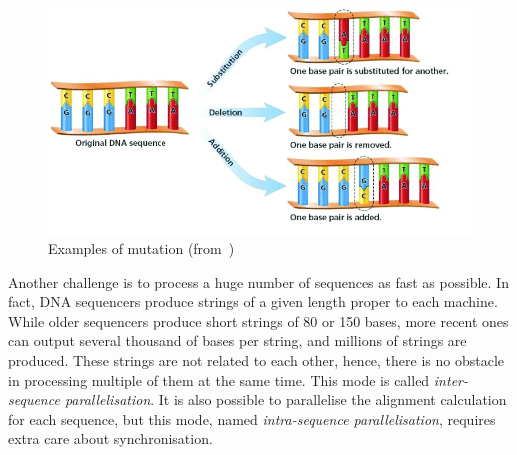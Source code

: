 \begin{figure}[h!]
	\centering
	\includegraphics[width=0.7\linewidth]{mutation}
	\caption{Examples of mutation (from~\cite{alasadi:chemistry})}
	\label{fig:mutation}
\end{figure}

Another challenge is to process a huge number of sequences as fast as possible. In fact, DNA sequencers produce strings of a given length proper to each machine. While older sequencers produce short strings of 80 or 150 bases, more recent ones can output several thousand of bases per string, and millions of strings are produced. These strings are not related to each other, hence, there is no obstacle in processing multiple of them at the same time. This mode is called \emph{inter-sequence parallelisation}. It is also possible to parallelise the alignment calculation for each sequence, but this mode, named \emph{intra-sequence parallelisation}, requires extra care about synchronisation.


